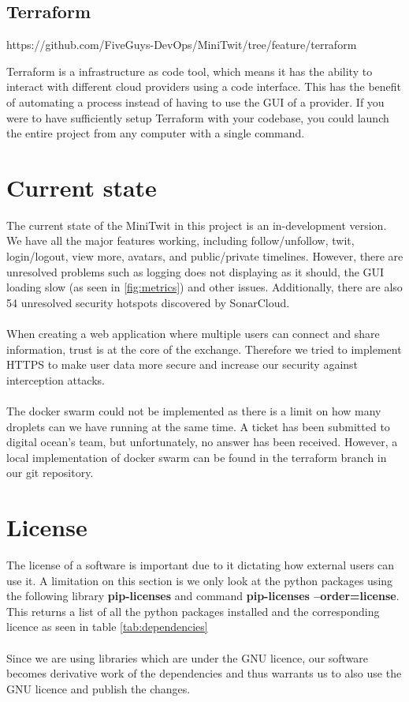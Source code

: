 \subsection*{Terraform}
https://github.com/FiveGuys-DevOps/MiniTwit/tree/feature/terraform

Terraform is a infrastructure as code tool, which means it has the ability to interact with different cloud providers using a code interface. This has the benefit of automating a process instead of having to use the GUI of a provider. If you were to have sufficiently setup Terraform with your codebase, you could launch the entire project from any computer with a single command.


\section*{Current state}

The current state of the MiniTwit in this project is an in-development version. We have all the major features working, including follow/unfollow, twit, login/logout, view more, avatars, and public/private timelines. However, there are unresolved problems such as logging does not displaying as it should, the GUI loading slow (as seen in \ref{fig:metrics}) and other issues. Additionally, there are also 54 unresolved security hotspots discovered by SonarCloud.
\\\\
When creating a web application where multiple users can connect and share information, trust is at the core of the exchange. Therefore we tried to implement HTTPS to make user data more secure and increase our security against interception attacks.
\\\\
The docker swarm could not be implemented as there is a limit on how many droplets can we have running at the same time. A ticket has been submitted to digital ocean's team, but unfortunately, no answer has been received. However, a local implementation of docker swarm can be found in the terraform branch in our git repository.

\section*{License}

The license of a software is important due to it dictating how external users can use it. A limitation on this section is we only look at the python packages using the following library \textbf{pip-licenses} and command \textbf{pip-licenses --order=license}. This returns a list of all the python packages installed and the corresponding licence as seen in table \ref{tab:dependencies}
\\\\
Since we are using libraries which are under the GNU licence, our software becomes derivative work of the dependencies and thus warrants us to also use the GNU licence and publish the changes.

